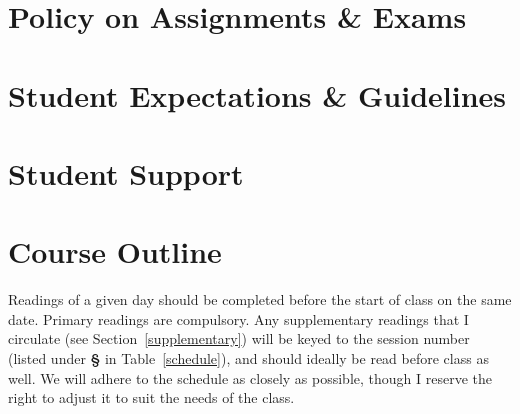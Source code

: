\documentclass[titlepage]{article}
\newcommand\path{../../syllabus}
\begin{document}


\section{Policy on Assignments \& Exams}
\label{policy}






\section{Student Expectations \& Guidelines}
\label{expectations}





\section{Student Support}
\label{support}




\section{Course Outline}
\label{outline}

Readings of a given day should be completed before the start of class
on the same date. Primary readings are compulsory. Any supplementary
readings that I circulate (see Section~\ref{supplementary}) will
be keyed to the session number (listed under \textbf{\S} in
Table~\ref{schedule}), and should ideally be read before class as well.
We will adhere to the schedule as closely as possible, though I reserve
the right to adjust it to suit the needs of the class.

\newcommand\Yhwh{\textsc{Yhwh}}
\newcommand\rarr{\char"2192\hspace*{0.5pt}}
\end{document}
